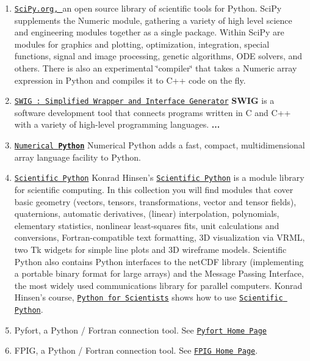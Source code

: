 \begin{enumerate}
\item \href{http://www.scipy.org}{\tt Sci\-Py.org, }an open source library of scientific tools for Python. Sci\-Py supplements the Numeric module, gathering a variety of high level science and engineering modules together as a single package. Within Sci\-Py are modules for graphics and plotting, optimization, integration, special functions, signal and image processing, genetic algorithms, ODE solvers, and others. There is also an experimental \char`\"{}compiler\char`\"{} that takes a Numeric array expression in Python and compiles it to C++ code on the fly.\item \href{http://www.swig.org/}{\tt SWIG : Simplified Wrapper and Interface Generator} {\bf SWIG} is a software development tool that connects programs written in C and C++ with a variety of high-level programming languages. {\bf ...}\item \href{http://www.pfdubois.com/numpy/}{\tt Numerical {\bf Python}} Numerical Python adds a fast, compact, multidimensional array language facility to Python.\item \href{http://starship.python.net/crew/hinsen/scientific.html}{\tt Scientific Python} Konrad Hinsen's \href{http://starship.python.net/crew/hinsen/scientific.html}{\tt Scientific Python} is a module library for scientific computing. In this collection you will find modules that cover basic geometry (vectors, tensors, transformations, vector and tensor fields), quaternions, automatic derivatives, (linear) interpolation, polynomials, elementary statistics, nonlinear least-squares fits, unit calculations and conversions, Fortran-compatible text formatting, 3D visualization via VRML, two Tk widgets for simple line plots and 3D wireframe models. Scientific Python also contains Python interfaces to the net\-CDF library (implementing a portable binary format for large arrays) and the Message Passing Interface, the most widely used communications library for parallel computers. Konrad Hinsen's course, \href{http://dirac.cnrs-orleans.fr/%7Ehinsen/courses.html}{\tt Python for Scientists} shows how to use \href{http://starship.python.net/crew/hinsen/scientific.html}{\tt Scientific Python}.\item Pyfort, a Python / Fortran connection tool. See \href{http://pyfortran.sourceforge.net}{\tt Pyfort Home Page}\item FPIG, a Python / Fortran connection tool. See \href{http://cens.ioc.ee/projects/f2py2e}{\tt FPIG Home Page}.\end{enumerate}
